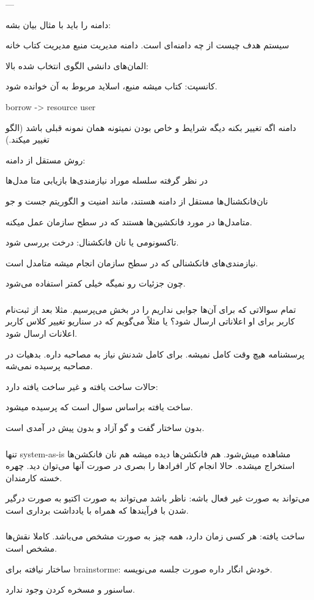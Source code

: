 ---
 
دامنه را باید با مثال بیان بشه:

سیستم هدف چیست از چه دامنه‌ای است. دامنه مدیریت منبع
مدیریت کتاب خانه

المان‌های دانشی الگوی انتخاب شده بالا:

کانسپت: کتاب میشه منبع، 
اسلاید مربوط به آن خوانده شود.

borrow -> resource user

دامنه اگه تغییر بکنه دیگه شرایط و خاص بودن نمیتونه همان نمونه قبلی باشد (الگو
تغییر میکند.)

روش مستقل از دامنه:

در نظر گرفته سلسله موراد نیازمندی‌ها
بازیابی متا مدل‌ها

نان‌فانکشنال‌ها مستقل از دامنه هستند، مانند امنیت و الگوریتم جست و جو

متامدل‌ها در مورد فانکشین‌ها هستند که در سطح سازمان عمل میکنه.

تاکسونومی یا نان فانکشنال:
درخت بررسی شود.

نیازمندی‌های فانکشنالی که در سطح سازمان انجام میشه متامدل است.

چون جزئیات رو نمیگه خیلی کمتر استفاده می‌شود.


\subsubsection{}

تمام سوالاتی که برای آن‌ها جوابی نداریم را در بخش  می‌پرسیم. مثلا
بعد از ثبت‌نام کاربر برای او اعلاناتی ارسال شود؟ یا مثلاً می‌گویم که در سناریو
تغییر کلاس کاربر اعلانات ارسال شود.

پرسشنامه هیچ وقت کامل نمیشه. برای کامل شدنش نیاز به مصاحبه داره. بدهیات در
مصاحبه پرسیده نمی‌شه.

حالات ساخت یافته و غیر ساخت یافته دارد:

ساخت یافته براساس سوال است که پرسیده میشود.

بدون ساختار گفت و گو آزاد و بدون پیش در آمدی است.

\subsubsection{}

تنها system-as-is مشاهده میش‌شود. هم فانکشن‌ها دیده میشه هم نان فانکشن‌ها
استخراج میشده.  حالا انجام کار افراد‌ها را بصری در صورت آنها می‌توان دید.
چهره خسته کارمندان.

می‌تواند به صورت غیر فعال باشه: ناظر باشد
می‌تواند به صورت اکتیو به صورت درگیر شدن با فرآیند‌ها که همراه با یادداشت برداری
است.


\subsubsection{}

ساخت یافته: هر کسی زمان دارد، همه چیز به صورت مشخص می‌باشد. کاملا نقش‌ها مشخص
است.

ساختار نیافته برای brainstorme: خودش انگار داره صورت جلسه می‌نویسه.

ساسنور و مسخره کردن وجود ندارد.
